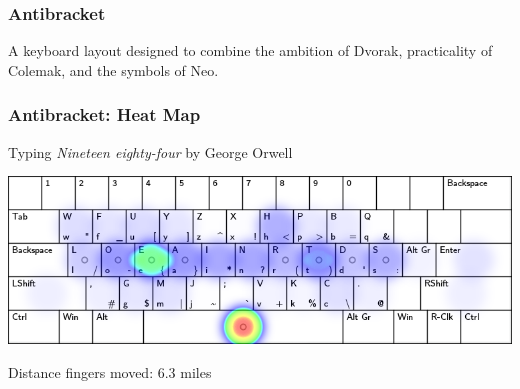 \documentclass{beamer}
\begin{document}
\begin{frame}
    \frametitle{Antibracket}
    A keyboard layout designed to combine the ambition of Dvorak, practicality
    of Colemak, and the symbols of Neo.
    \begin{center}
    \end{center}
\end{frame}

\begin{frame}
    \frametitle{Antibracket: Heat Map}
    Typing \emph{Nineteen eighty-four} by George Orwell
    \begin{center}
        \includegraphics[width=\linewidth]{graphics/abheat}\par
    Distance fingers moved: 6.3 miles
    \end{center}
\end{frame}
\end{document}
